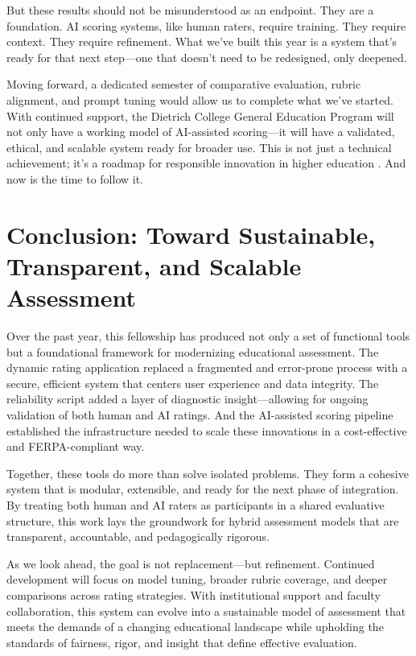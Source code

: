 \documentclass[12pt]{article}%
\begin{document}
But these results should not be misunderstood as an endpoint. They are a foundation. AI scoring systems, like human raters, require training. They require context. They require refinement. What we’ve built this year is a system that’s ready for that next step—one that doesn’t need to be redesigned, only deepened.

Moving forward, a dedicated semester of comparative evaluation, rubric alignment, and prompt tuning would allow us to complete what we’ve started. With continued support, the Dietrich College General Education Program will not only have a working model of AI-assisted scoring—it will have a validated, ethical, and scalable system ready for broader use. This is not just a technical achievement; it’s a roadmap for responsible innovation in higher education \cite{holmes2021AI, luckin2016AI}. And now is the time to follow it.

\section{Conclusion: Toward Sustainable, Transparent, and Scalable Assessment}

Over the past year, this fellowship has produced not only a set of functional tools but a foundational framework for modernizing educational assessment. The dynamic rating application replaced a fragmented and error-prone process with a secure, efficient system that centers user experience and data integrity. The reliability script added a layer of diagnostic insight—allowing for ongoing validation of both human and AI ratings. And the AI-assisted scoring pipeline established the infrastructure needed to scale these innovations in a cost-effective and FERPA-compliant way.

Together, these tools do more than solve isolated problems. They form a cohesive system that is modular, extensible, and ready for the next phase of integration. By treating both human and AI raters as participants in a shared evaluative structure, this work lays the groundwork for hybrid assessment models that are transparent, accountable, and pedagogically rigorous.

As we look ahead, the goal is not replacement—but refinement. Continued development will focus on model tuning, broader rubric coverage, and deeper comparisons across rating strategies. With institutional support and faculty collaboration, this system can evolve into a sustainable model of assessment that meets the demands of a changing educational landscape while upholding the standards of fairness, rigor, and insight that define effective evaluation.
\end{document}
